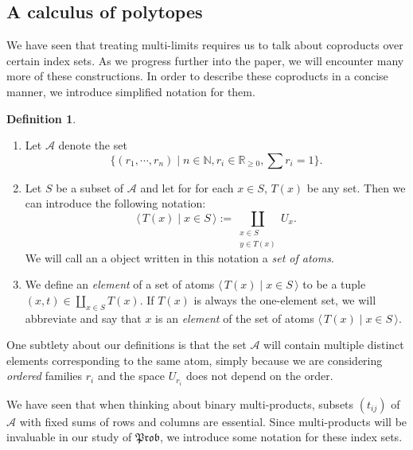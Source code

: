 \documentclass[a4paper]{amsproc}
\theoremstyle{plain}
\theoremstyle{definition}
\newtheorem{definition}[theorem]{Definition}
\theoremstyle{remark}
\numberwithin{equation}{section}
\newcommand{\Prob}{\mathfrak{Prob}}
\newcommand{\la}{\langle\,}
\newcommand{\ra}{\,\rangle}
\begin{document}
\subsection{A calculus of polytopes}

We have seen that treating multi-limits requires us to talk about coproducts over certain index sets. As we progress further into the paper, we will encounter many more of these constructions. In order to describe these coproducts in a concise manner, we introduce simplified notation for them.


\begin{definition}
    \begin{enumerate}
        \item Let $\mathcal{A}$ denote the set
        \[
            \{(r_1,\cdots, r_n) \mid n \in \mathbb{N}, r_i \in \mathbb{R}_{\geq 0}, \sum r_i = 1\}.
        \]
        \item Let $S$ be a subset of $\mathcal{A}$ and let for for each $x \in S$, $T(x)$ be any set. Then we can introduce the following notation:
        \[
            \la T(x) \mid x \in S \ra := \coprod_{\substack{x \in S \\ y \in T(x)}} U_x .
        \]
        We will call an a object written in this notation a \emph{set of atoms}.
        \item We define an \emph{element} of a set of atoms $\la T(x) \mid x \in S \ra$ to be a tuple $(x,t) \in \coprod_{x \in S} T(x)$. If $T(x)$ is always the one-element set, we will abbreviate and say that $x$ is an \emph{element} of the set of atoms $\la T(x) \mid x \in S \ra$.
    \end{enumerate}
\end{definition}

One subtlety about our definitions is that the set $\mathcal{A}$ will contain multiple distinct elements corresponding to the same atom, simply because we are considering \emph{ordered} families $r_i$ and the space $U_{r_i}$ does not depend on the order.

We have seen that when thinking about binary multi-products, subsets $(t_{ij})$ of $\mathcal{A}$ with fixed sums of rows and columns are essential. Since multi-products will be invaluable in our study of $\Prob$, we introduce some notation for these index sets.
\end{document}
